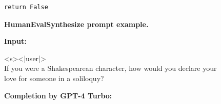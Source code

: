 \documentclass{article}
\begin{document}
\begin{figure}[htbp]
\begin{lstlisting}
return False
\end{lstlisting}

\hrulefill

\caption{\textbf{HumanEvalSynthesize prompt example.}}
\label{fig:humaneval}
\end{figure}

\begin{figure}[htbp]
\hrulefill

\textbf{Input:}

\hrulefill

<s><|user|>\\
If you were a Shakespearean character, how would you declare your love for someone in a soliloquy?

\hrulefill

\textbf{Completion by GPT-4 Turbo:}

\hrulefill


\end{figure}
\end{document}
